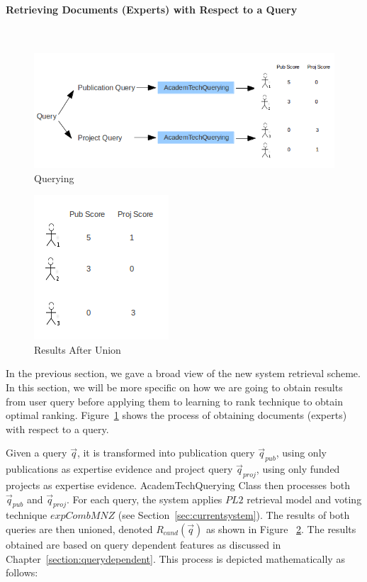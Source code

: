 \paragraph{Retrieving Documents (Experts) with Respect to a Query} \hspace{0pt} \\

\begin{figure}
\centering
\includegraphics[scale=0.4]{./figures/querying.png}
\caption{Querying} \label{fig:quering} 
\end{figure}
\quad
\begin{figure}
\centering
\includegraphics[scale=0.7]{./figures/union.png}
\caption{Results After Union} \label{fig:union} 
\end{figure}
In the previous section, we gave a broad view of the new system retrieval scheme. In this section, we will be more specific on how we are going to 
obtain results from user query before applying them to learning to rank technique to obtain optimal ranking.
Figure~\ref{fig:quering} shows the process of obtaining documents (experts) with respect to a query. 

Given a query $\vec{q}$, it is transformed into publication query $\vec{q}_{pub}$, using only publications as expertise evidence and project
query $\vec{q}_{proj}$, using only funded projects as expertise evidence. 
AcademTechQuerying Class then processes both $\vec{q}_{pub}$ and $\vec{q}_{proj}$. For each query, the system applies $PL2$
retrieval model and voting technique $expCombMNZ$ (see Section~\ref{sec:currentsystem}). The results of both
queries are then unioned, denoted $R_{cand}(\vec{q})$ as shown in Figure ~\ref{fig:union}. The results obtained are based on query dependent features 
as discussed in Chapter~\ref{section:querydependent}. This process is depicted mathematically as follows:

